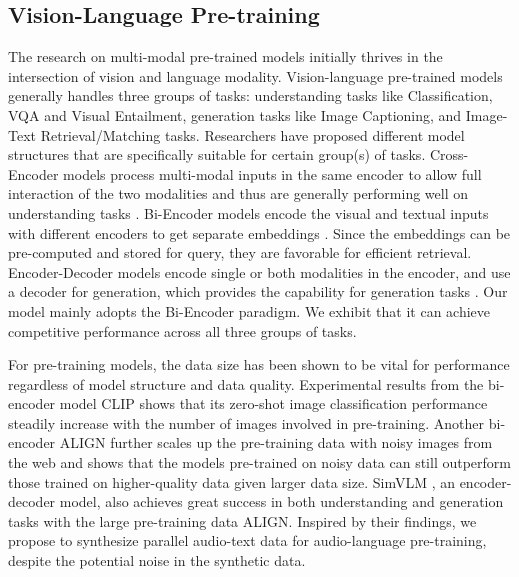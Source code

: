 \documentclass[sigconf,anonymous,review]{acmart}
\begin{document}
\subsection{Vision-Language Pre-training}
The research on multi-modal pre-trained models initially thrives in the intersection of vision and language modality. 
Vision-language pre-trained models generally handles three groups of tasks: understanding tasks like Classification, VQA and Visual Entailment, generation tasks like Image Captioning, and Image-Text Retrieval/Matching tasks.
Researchers have proposed different model structures that are specifically suitable for certain group(s) of tasks. 
Cross-Encoder models process multi-modal inputs in the same encoder to allow full interaction of the two modalities and thus are generally performing well on understanding tasks \citep{chen2020uniter,li2020oscar}. 
Bi-Encoder models encode the visual and textual inputs with different encoders to get separate embeddings  \citep{radford2021learning,jia2021scaling}.
Since the embeddings can be pre-computed and stored for query, they are favorable for efficient retrieval. 
Encoder-Decoder models encode single or both modalities in the encoder, and use a decoder for generation, which provides the capability for generation tasks \citep{wang2021simvlm,wang2022unifying}.
Our model mainly adopts the Bi-Encoder paradigm.
We exhibit that it can achieve competitive performance across all three groups of tasks.

For pre-training models, the data size has been shown to be vital for performance regardless of model structure and data quality. %
Experimental results from the bi-encoder model CLIP shows that its zero-shot image classification performance steadily increase with the number of images involved in pre-training.
Another bi-encoder ALIGN \citep{jia2021scaling} further scales up the pre-training data with noisy images from the web and shows that the models pre-trained on noisy data can still outperform those trained on higher-quality data given larger data size.
SimVLM \citep{wang2021simvlm}, an encoder-decoder model, also achieves great success in both understanding and generation tasks with the large pre-training data ALIGN.
Inspired by their findings, we propose to synthesize parallel audio-text data for audio-language pre-training, despite the potential noise in the synthetic data.
\end{document}

